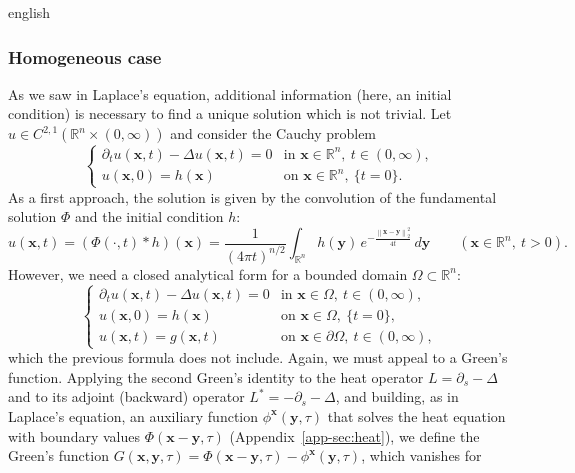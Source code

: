 \documentclass[12pt,letterpaper,twoside]{book}
\newcommand{\norm}[1]{\left\lVert #1 \right\rVert}
\begin{document}
\begin{hyphenrules}{english}
\subsubsection{Homogeneous case}
As we saw in Laplace's equation, additional information (here, an initial condition) is necessary to
find a unique solution which is not trivial. Let $u\in C^{2,1}(\mathbb{R}^n\times(0,\infty))$ and consider the
Cauchy problem
\begin{equation}
  \begin{cases}
    \partial_t u(\mathbf{x},t)-\Delta u(\mathbf{x},t)=0 & \text{in } \mathbf{x}\in\mathbb{R}^n,\ t\in(0,\infty),\\
    u(\mathbf{x},0)=h(\mathbf{x}) & \text{on } \mathbf{x}\in\mathbb{R}^n,\ \{t=0\}.
  \end{cases}
  \label{eq:heat-cauchy}
\end{equation}
As a first approach, the solution is given by the convolution of the fundamental solution $\Phi$ and
the initial condition $h$:
\begin{equation}
  u(\mathbf{x},t)=(\Phi(\cdot,t)*h)(\mathbf{x})=\frac{1}{(4\pi t)^{n/2}}\int_{\mathbb{R}^n}h(\mathbf{y})\,
  e^{-\frac{\norm{\mathbf{x}-\mathbf{y}}_2^2}{4t}}\,d\mathbf{y}\qquad(\mathbf{x}\in\mathbb{R}^n,\ t>0).
  \label{eq:heat-convolution}
\end{equation}
However, we need a closed analytical form for a bounded domain $\Omega\subset\mathbb{R}^n$:
\begin{equation}
  \begin{cases}
    \partial_t u(\mathbf{x},t)-\Delta u(\mathbf{x},t)=0 & \text{in } \mathbf{x}\in\Omega,\ t\in(0,\infty),\\
    u(\mathbf{x},0)=h(\mathbf{x}) & \text{on } \mathbf{x}\in\Omega,\ \{t=0\},\\
    u(\mathbf{x},t)=g(\mathbf{x},t) & \text{on } \mathbf{x}\in\partial\Omega,\ t\in(0,\infty),
  \end{cases}
  \label{eq:heat-ibvp}
\end{equation}
which the previous formula does not include. Again, we must appeal to a Green's function. Applying the
second Green's identity to the heat operator $L=\partial_s-\Delta$ and to its adjoint (backward) operator
$L^{*}=-\partial_s-\Delta$, and building, as in Laplace's equation, an auxiliary function
$\phi^{\mathbf{x}}(\mathbf{y},\tau)$ that solves the heat equation with boundary values
$\Phi(\mathbf{x}-\mathbf{y},\tau)$ (Appendix~\ref{app-sec:heat}), we define the Green's function
$G(\mathbf{x},\mathbf{y},\tau)=\Phi(\mathbf{x}-\mathbf{y},\tau)-\phi^{\mathbf{x}}(\mathbf{y},\tau)$, which vanishes for

\end{hyphenrules}
\end{document}
